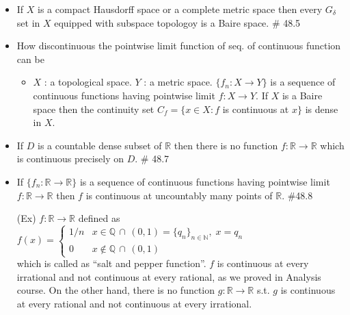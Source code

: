 \documentclass[12pt]{article}
\newcommand{\Nat}{\mathbb{N}}
\newcommand{\Real}{\mathbb{R}}
\begin{document}
\begin{itemize}
	\item If $X$ is a compact Hausdorff space or a complete metric space then every $G_\delta$ set in $X$ equipped with subspace topologoy is a Baire space. \quad \# 48.5 
\clearpage
	\item How discontinuous the pointwise limit function of seq. of continuous function can be
	\begin{itemize}
		\item $X$ : a topological space. $Y$ : a metric space. $\{f_n : X\rightarrow Y\}$ is a sequence of continuous functions having pointwise limit $f:X\rightarrow Y$. If $X$ is a Baire space then the continuity set $C_f=\{x\in X : f$ is continuous at $x\}$ is dense in $X$.
	\end{itemize}
	\item If $D$ is a countable dense subset of $\Real$ then there is no function $f:\Real\rightarrow \Real $ which is continuous precisely on $D$. \quad \# 48.7
	\item If  $\{f_n : \Real \rightarrow \Real\}$ is a sequence of continuous functions having pointwise limit $f:\Real\rightarrow \Real$ then $f$ is continuous at uncountably many points of $\Real$. \quad \#48.8
	\item[(Ex)] $f: \Real \rightarrow \Real$ defined as $f(x)=\begin{cases}1/n & x\in \mathbb{Q}\, \cap\, (0,1)=\{q_n\}_{n\in \Nat}, \; x = q_n\\0 & x \notin \mathbb{Q}\,\cap\,(0,1) \end{cases}$ \\ which is called as ``salt and pepper function''. $f$ is continuous at every irrational and not continuous at every rational, as we proved in Analysis course. On the other hand, there is no function $g: \Real \rightarrow \Real$ s.t. $g$ is continuous at every rational and not continuous at every irrational.
\end{itemize}
\end{document}
